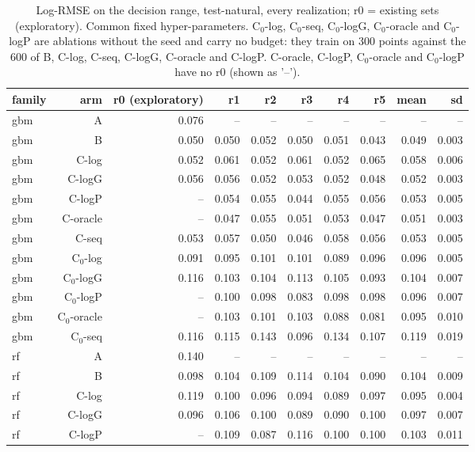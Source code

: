 \begin{table}[htbp]
\centering
\caption{Log-RMSE on the decision range, test-natural, every realization; r0 = existing sets (exploratory). Common fixed hyper-parameters. C$_0$-log, C$_0$-seq, C$_0$-logG, C$_0$-oracle and C$_0$-logP are ablations without the seed and carry no budget: they train on 300 points against the 600 of B, C-log, C-seq, C-logG, C-oracle and C-logP. C-oracle, C-logP, C$_0$-oracle and C$_0$-logP have no r0 (shown as '--').}
\label{tab:rep:test-natural:values}
\begin{tabular}{lrrrrrrrrr}
\toprule
family & arm & r0 (exploratory) & r1 & r2 & r3 & r4 & r5 & mean & sd \\
\midrule
gbm & A & 0.076 & -- & -- & -- & -- & -- & -- & -- \\
gbm & B & 0.050 & 0.050 & 0.052 & 0.050 & 0.051 & 0.043 & 0.049 & 0.003 \\
gbm & C-log & 0.052 & 0.061 & 0.052 & 0.061 & 0.052 & 0.065 & 0.058 & 0.006 \\
gbm & C-logG & 0.056 & 0.056 & 0.052 & 0.053 & 0.052 & 0.048 & 0.052 & 0.003 \\
gbm & C-logP & -- & 0.054 & 0.055 & 0.044 & 0.055 & 0.056 & 0.053 & 0.005 \\
gbm & C-oracle & -- & 0.047 & 0.055 & 0.051 & 0.053 & 0.047 & 0.051 & 0.003 \\
gbm & C-seq & 0.053 & 0.057 & 0.050 & 0.046 & 0.058 & 0.056 & 0.053 & 0.005 \\
gbm & C$_0$-log & 0.091 & 0.095 & 0.101 & 0.101 & 0.089 & 0.096 & 0.096 & 0.005 \\
gbm & C$_0$-logG & 0.116 & 0.103 & 0.104 & 0.113 & 0.105 & 0.093 & 0.104 & 0.007 \\
gbm & C$_0$-logP & -- & 0.100 & 0.098 & 0.083 & 0.098 & 0.098 & 0.096 & 0.007 \\
gbm & C$_0$-oracle & -- & 0.103 & 0.101 & 0.103 & 0.088 & 0.081 & 0.095 & 0.010 \\
gbm & C$_0$-seq & 0.116 & 0.115 & 0.143 & 0.096 & 0.134 & 0.107 & 0.119 & 0.019 \\
rf & A & 0.140 & -- & -- & -- & -- & -- & -- & -- \\
rf & B & 0.098 & 0.104 & 0.109 & 0.114 & 0.104 & 0.090 & 0.104 & 0.009 \\
rf & C-log & 0.119 & 0.100 & 0.096 & 0.094 & 0.089 & 0.097 & 0.095 & 0.004 \\
rf & C-logG & 0.096 & 0.106 & 0.100 & 0.089 & 0.090 & 0.100 & 0.097 & 0.007 \\
rf & C-logP & -- & 0.109 & 0.087 & 0.116 & 0.100 & 0.100 & 0.103 & 0.011 \\

\end{tabular}
\end{table}
